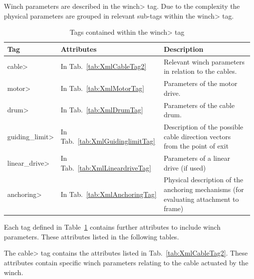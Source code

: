 Winch parameters are described in the \<winch> tag. Due to the complexity the
physical parameters are grouped in relevant sub-tags within the \<winch> tag.

\begin{table}
  \centering
  \caption{Tags contained within the \<winch> tag}
  \label{tab:XmlWinchTagOverview}
  \begin{tabular}{p{}p{}p{}}
    \hline\hline
    Tag  & Attributes  &  Description \\
    \hline
    \<cable> & In Tab.~\ref{tab:XmlCableTag2} & Relevant winch parameters in relation to the cables.\\
    \<motor> & In Tab.~\ref{tab:XmlMotorTag} & Parameters of the motor drive.\\
    \<drum> & In Tab.~\ref{tab:XmlDrumTag} & Parameters of the cable drum.\\
    \<guiding\_limit> & In Tab.~\ref{tab:XmlGuidinglimitTag} & Description of the possible cable direction vectors from the point of exit\\
    \<linear\_drive> & In Tab.~\ref{tab:XmlLineardriveTag} & Parameters of a linear drive (if used)\\
    \<anchoring> & In Tab.~\ref{tab:XmlAnchoringTag} & Physical description of the anchoring mechanisms (for evaluating attachment to frame)\\
    \hline\hline
  \end{tabular}
\end{table}

Each tag defined in Table~\ref{tab:XmlWinchTagOverview} contains further
attributes to include winch parameters. These attributes listed in the
following tables.

The \<cable> tag contains the attributes listed in Tab.~\ref{tab:XmlCableTag2}.
These attributes contain specific winch parameters relating to the cable
actuated by the winch.

